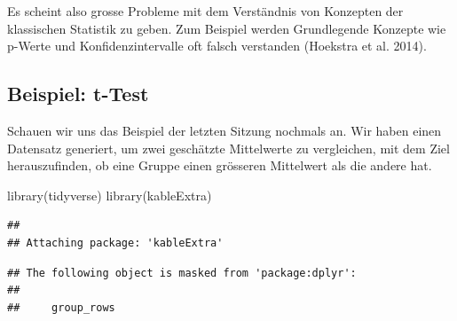 \documentclass[]{tufte-handout}
\newenvironment{Shaded}{}{}
\newcommand{\FunctionTok}[1]{\textcolor[rgb]{0.02,0.16,0.49}{#1}}
\newcommand{\NormalTok}[1]{#1}
\begin{document}
Es scheint also grosse Probleme mit dem Verständnis von Konzepten der
klassischen Statistik zu geben. Zum Beispiel werden Grundlegende
Konzepte wie p-Werte und Konfidenzintervalle oft falsch verstanden
(Hoekstra et al. 2014).

\hypertarget{beispiel-t-test}{%
\subsection{Beispiel: t-Test}\label{beispiel-t-test}}

Schauen wir uns das Beispiel der letzten Sitzung nochmals an. Wir haben
einen Datensatz generiert, um zwei geschätzte Mittelwerte zu
vergleichen, mit dem Ziel herauszufinden, ob eine Gruppe einen grösseren
Mittelwert als die andere hat.

\begin{Shaded}
\begin{Highlighting}[]
\FunctionTok{library}\NormalTok{(tidyverse)}
\FunctionTok{library}\NormalTok{(kableExtra)}
\end{Highlighting}
\end{Shaded}

\begin{verbatim}
## 
## Attaching package: 'kableExtra'
\end{verbatim}

\begin{verbatim}
## The following object is masked from 'package:dplyr':
## 
##     group_rows
\end{verbatim}
\end{document}
